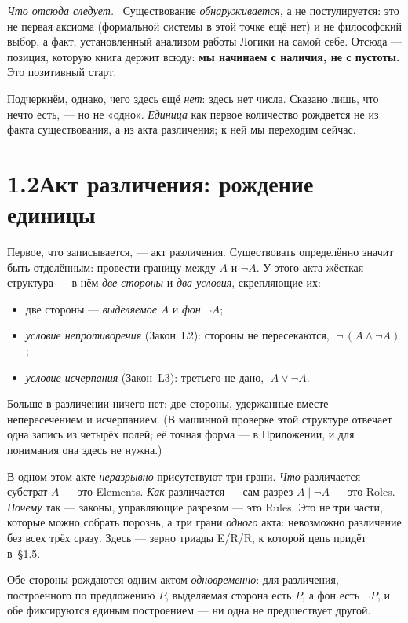 \documentclass[12pt,a4paper]{article}
\newcommand{\rezultat}{\medskip\noindent\emph{Что отсюда следует.}\ }
\begin{document}
\rezultat
Существование \emph{обнаруживается}, а не постулируется: это не первая аксиома
(формальной системы в этой точке ещё нет) и не философский выбор, а факт,
установленный анализом работы Логики на самой себе. Отсюда --- позиция, которую книга
держит всюду: \textbf{мы начинаем с наличия, не с пустоты.} Это позитивный старт.

Подчеркнём, однако, чего здесь ещё \emph{нет}: здесь нет числа. Сказано лишь, что
нечто есть, --- но не «одно». \emph{Единица} как первое количество рождается не из
факта существования, а из акта различения; к ней мы переходим сейчас.

\section*{1.2\quad Акт различения: рождение единицы}

Первое, что записывается, --- акт различения. Существовать определённо значит быть
отделённым: провести границу между $A$ и $\neg A$. У этого акта жёсткая структура --- в нём
\emph{две стороны} и \emph{два условия}, скрепляющие их:
\begin{itemize}
\item две стороны --- \emph{выделяемое} $A$ и \emph{фон} $\neg A$;
\item \emph{условие непротиворечия} (Закон~L2): стороны не пересекаются, $\;\neg\,(A \wedge \neg A)$;
\item \emph{условие исчерпания} (Закон~L3): третьего не дано, $\;A \vee \neg A$.
\end{itemize}
Больше в различении ничего нет: две стороны, удержанные вместе непересечением и исчерпанием.
(В машинной проверке этой структуре отвечает одна запись из четырёх полей; её точная форма ---
в Приложении, и для понимания она здесь не нужна.)

В одном этом акте \emph{неразрывно} присутствуют три грани. \emph{Что} различается ---
субстрат $A$ --- это Elements. \emph{Как} различается --- сам разрез $A\mid\neg A$ ---
это Roles. \emph{Почему} так --- законы, управляющие разрезом --- это Rules. Это не три
части, которые можно собрать порознь, а три грани \emph{одного} акта: невозможно
различение без всех трёх сразу. Здесь --- зерно триады E/R/R, к которой цепь придёт
в~§1.5.

Обе стороны рождаются одним актом \emph{одновременно}: для различения, построенного по
предложению $P$, выделяемая сторона есть $P$, а фон есть $\neg P$, и обе фиксируются
единым построением --- ни одна не предшествует другой.
\end{document}
